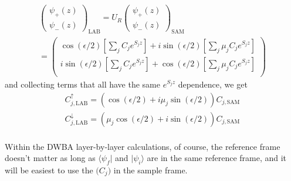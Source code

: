 \documentclass[%
 reprint,
 amsmath,
 amssymb,
 aps,
 prl,
 lengthcheck,%
]{revtex4-1}
\begin{document}
\begin{equation}
  \begin{array}{l}
    \left(
    \begin{matrix}
    \psi_+(z) \\
    \psi_-(z)
    \end{matrix}
    \right)_{\textrm{LAB}}
    = U_R
    \left(
    \begin{matrix}
    \psi_+(z) \\
    \psi_-(z)
    \end{matrix}
    \right)_{\textrm{SAM}}
    \\[2em]
    = \left(
    \begin{matrix}
      \cos(\epsilon/2)[\sum_j C_j e^{S_j z}] + i \sin(\epsilon/2)[\sum_j \mu_j C_j e^{S_j z}] \\
      i \sin(\epsilon/2)[\sum_j C_j e^{S_j z}] + \cos(\epsilon/2)[\sum_j \mu_j C_j e^{S_j z}] \\
    \end{matrix}
    \right)
  \end{array}
\end{equation}
and collecting terms that all have the same $e^{S_j z}$ dependence, we get
\begin{equation}
  \begin{array}{l}
    C^{\uparrow}_{j,\textrm{LAB}} = \left(\cos(\epsilon/2) + i\mu_j \sin(\epsilon/2)\right)C_{j,\textrm{SAM}} \\
    C^{\downarrow}_{j,\textrm{LAB}} = \left(\mu_j \cos(\epsilon/2) + i \sin(\epsilon/2)\right)C_{j,\textrm{SAM}} \\
  \end{array}
\end{equation}

Within the DWBA layer-by-layer calculations, of course, the reference frame doesn't
matter as long as $\langle \psi_f |$ and $| \psi_i \rangle$ are in the same 
reference frame, and it will be easiest to use the $\bigg(C_j\bigg)$ in the sample
frame.


\end{document}
